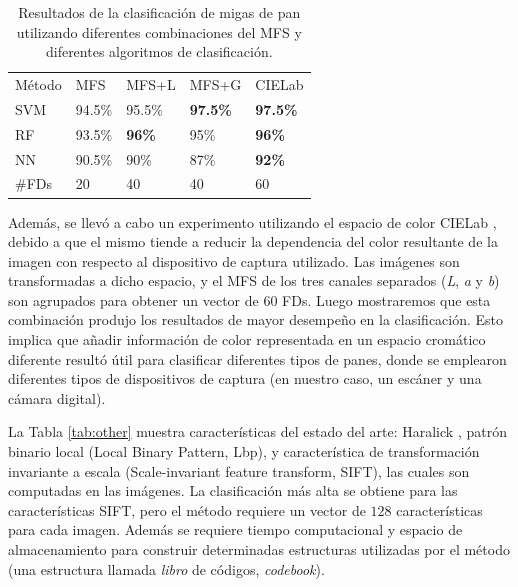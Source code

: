 \begin{table}[h!]
\center
\begin{tabular}{lllll}
\hline\noalign{\smallskip}
Método & MFS & MFS+L & MFS+G & CIELab  \\
\noalign{\smallskip}\hline\noalign{\smallskip}
SVM & 94.5\% & 95.5\% & \textbf{97.5\%} & \textbf{97.5\%} \\
RF  & 93.5\% & \textbf{96\%} & 95\% & \textbf{96\%} \\
NN & 90.5\% & 90\% & 87\% & \textbf{92\%} \\
\noalign{\smallskip}\hline
\#FDs & 20 & 40 & 40 & 60 \\
\hline
\end{tabular}
\caption{Resultados de la clasificación de migas de pan utilizando diferentes combinaciones del MFS y diferentes algoritmos de clasificación.}
\label{tab:mfs}       %
\end{table}

Además, se llevó a cabo un experimento utilizando el espacio de color CIELab \cite{Hunter58}, debido a que el mismo tiende a reducir la dependencia del color resultante de la imagen con respecto al dispositivo de captura utilizado.
Las imágenes son transformadas a dicho espacio, y el MFS de los tres canales separados ({\em L}, {\em a} y {\em b}) son agrupados para obtener un vector de $60$ FDs.
Luego mostraremos que esta combinación produjo los resultados de mayor desempeño en la clasificación.
Esto implica que añadir información de color representada en un espacio cromático diferente resultó útil para clasificar diferentes tipos de panes, donde se emplearon diferentes tipos de dispositivos de captura (en nuestro caso, un escáner y una cámara digital).

La Tabla \ref{tab:other} muestra características del estado del arte: Haralick \cite{Haralick73}, patrón binario local \cite{Ojala96} (Local Binary Pattern, \acrshort{Lbp}), y característica de transformación invariante a escala \cite{Lowe2004} (Scale-invariant feature transform, \acrshort{SIFT}), las cuales son computadas en las imágenes.
La clasificación más alta se obtiene para las características SIFT, pero el método requiere un vector de $128$ características para cada imagen.
Además se requiere tiempo computacional y espacio de almacenamiento para construir determinadas estructuras utilizadas por el método (una estructura llamada {\em libro} de códigos, {\em codebook}).


